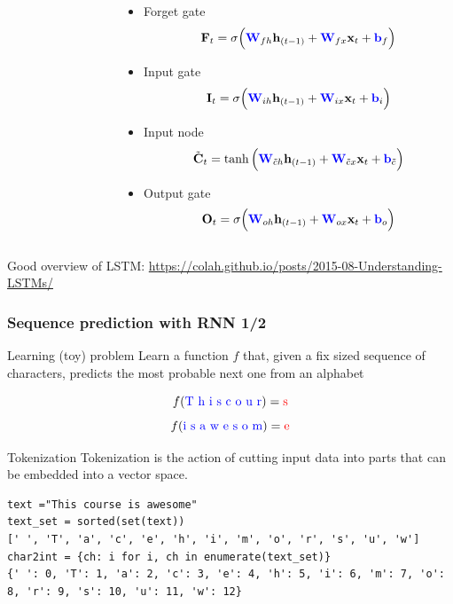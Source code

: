 \documentclass[pressentation,10pt,aspectratio=169,xcolor=table, colorlinks=true]{beamer}
\begin{document}
\begin{frame}[fragile]
\begin{columns}
\begin{column}{0.65\linewidth}
\begin{tikzpicture}
      \end{tikzpicture}
    \end{column}
    \begin{column}{0.375\linewidth}
      \begin{itemize}
      \item Forget gate
        \[\mathbf{F}_t = \sigma\Big(\textcolor{blue}{\mathbf{W}}_{fh}\mathbf{h}_{(t-1)} + \textcolor{blue}{\mathbf{W}}_{fx}\mathbf{x}_{t} + \textcolor{blue}{\mathbf{b}}_f\Big)\]
      \item Input gate
        \[\mathbf{I}_t = \sigma\Big(\textcolor{blue}{\mathbf{W}}_{ih}\mathbf{h}_{(t-1)} + \textcolor{blue}{\mathbf{W}}_{ix}\mathbf{x}_{t} + \textcolor{blue}{\mathbf{b}}_i\Big)\]
      \item Input node
        \[\tilde{\mathbf{C}}_t = \tanh\Big(\textcolor{blue}{\mathbf{W}}_{\tilde{c}h}\mathbf{h}_{(t-1)} + \textcolor{blue}{\mathbf{W}}_{\tilde{c}x}\mathbf{x}_{t} + \textcolor{blue}{\mathbf{b}}_{\tilde{c}}\Big)\]
      \item Output gate
        \[\mathbf{O}_t = \sigma\Big(\textcolor{blue}{\mathbf{W}}_{oh}\mathbf{h}_{(t-1)} + \textcolor{blue}{\mathbf{W}}_{ox}\mathbf{x}_{t} + \textcolor{blue}{\mathbf{b}}_o\Big)\]
      \end{itemize}
    \end{column}
  \end{columns}

  {\small Good overview of LSTM: \url{https://colah.github.io/posts/2015-08-Understanding-LSTMs/}}
\end{frame}

\begin{frame}[fragile]
  \frametitle{Sequence prediction with RNN 1/2}
  \begin{block}{Learning (toy) problem}
    Learn a function \(f\) that, given a fix sized sequence of characters, predicts the most probable next one from an alphabet

    \[f(\text{\textcolor{blue}{T h i s   c o u r}}) = \text{\textcolor{red}{s}}\]
    \[f(\text{\textcolor{blue}{i s   a w e s o m}}) = \text{\textcolor{red}{e}}\]
  \end{block}
  \begin{block}{Tokenization}
    Tokenization is the action of cutting input data into parts that can be embedded into a vector space.
\begin{verbatim}
text ="This course is awesome"
text_set = sorted(set(text))
[' ', 'T', 'a', 'c', 'e', 'h', 'i', 'm', 'o', 'r', 's', 'u', 'w']
char2int = {ch: i for i, ch in enumerate(text_set)}
{' ': 0, 'T': 1, 'a': 2, 'c': 3, 'e': 4, 'h': 5, 'i': 6, 'm': 7, 'o': 8, 'r': 9, 's': 10, 'u': 11, 'w': 12}
\end{verbatim}
  \end{block}

\end{frame}
\end{document}
